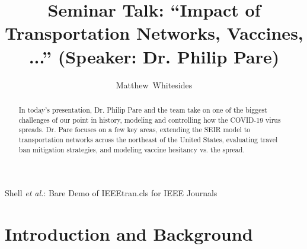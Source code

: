 \documentclass[journal,onecolumn]{IEEEtran}
\begin{document}
%
\title{Seminar Talk: ``Impact of Transportation Networks, Vaccines, ...'' (Speaker: Dr. Philip Pare)}

%
%
%
\author{Matthew~Whitesides}%

%
{Shell \MakeLowercase{\textit{et al.}}: Bare Demo of IEEEtran.cls for IEEE Journals}

\maketitle

\begin{abstract}
  In today's presentation, Dr. Philip Pare and the team take on one of the biggest challenges of our point in history, modeling and controlling how the COVID-19 virus spreads. Dr. Pare focuses on a few key areas, extending the SEIR model to transportation networks across the northeast of the United States, evaluating travel ban mitigation strategies, and modeling vaccine hesitancy vs. the spread. 
\end{abstract}


\IEEEpeerreviewmaketitle

\section{Introduction and Background}
\end{document}
